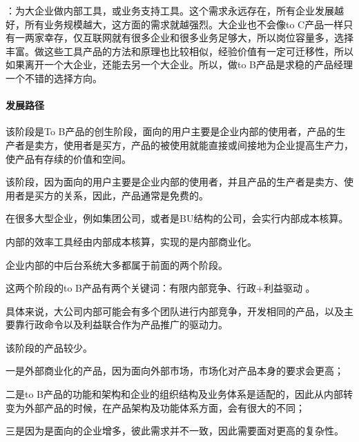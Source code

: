 \documentclass[letterpaper,11pt,english]{sphinxmanual}
\begin{document}
：为大企业做内部工具，或业务支持工具。这个需求永远存在，所有企业发展越好，所有业务规模越大，这方面的需求就越强烈。大企业也不会像to
C产品一样只有一两家幸存，仅互联网就有很多企业和很多业务足够大，所以岗位容量多，选择丰富。做这些工具产品的方法和原理也比较相似，经验价值有一定可迁移性，所以如果离开一个大企业，还能去另一个大企业。所以，做to
B产品是求稳的产品经理一个不错的选择方向。
%
\begin{footnote}[51]\sphinxAtStartFootnote
{}
%
\end{footnote}


\paragraph{发展路径}
\label{\detokenize{chapter_introduction/2B:id13}}

该阶段是To
B产品的创生阶段，面向的用户主要是企业内部的使用者，产品的生产者是卖方，使用者是买方，产品的被使用就能直接或间接地为企业提高生产力，使产品有存续的价值和空间。

该阶段，因为面向的用户主要是企业内部的使用者，并且产品的生产者是卖方、使用者是买方的关系，因此，产品通常是免费的。


在很多大型企业，例如集团公司，或者是BU结构的公司，会实行内部成本核算。

内部的效率工具经由内部成本核算，实现的是内部商业化。

企业内部的中后台系统大多都属于前面的两个阶段。

这两个阶段的to B产品有两个关键词：有限内部竞争、行政+利益驱动 。

具体来说，大公司内部可能会有多个团队进行内部竞争，开发相同的产品，以及主要靠行政命令以及利益联合作为产品推广的驱动力。


该阶段的产品较少。

一是外部商业化的产品，因为面向外部市场，市场化对产品本身的要求会更高；

二是to
B产品的功能和架构和企业的组织结构及业务体系是适配的，因此从内部转变为外部产品的时候，在产品架构及功能体系方面，会有很大的不同；

三是因为是面向的企业增多，彼此需求并不一致，因此需要面对更高的复杂性。
\end{document}
